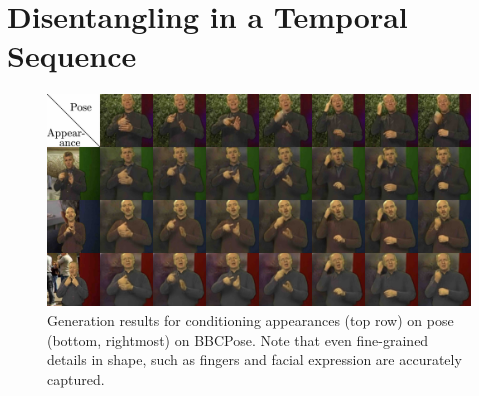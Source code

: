 \section{Disentangling in a Temporal Sequence}\label{sec:videotovideo}

	\begin{figure}[htp]
		\centering
		\includegraphics[trim={0cm 0cm 0cm 0cm},clip, width=1.\linewidth]{fig/factor/bbc_arrange}
		\caption{Generation results for conditioning appearances (top row) on pose (bottom, rightmost) on BBCPose.
		Note that even fine-grained details in shape, such as fingers and facial expression are accurately captured.}
		\label{fig:bbcthumb}
	\end{figure}



